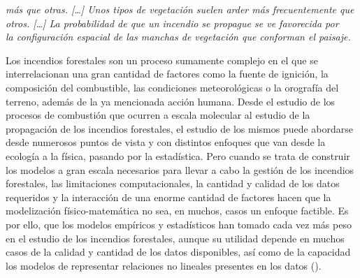 \documentclass[12pt,a4paper,]{book}
\numberwithin{dummy}{section}
\theoremstyle{ocrenumbox}
\theoremstyle{blacknumex}
\theoremstyle{blacknumbox}
\theoremstyle{ocrenum}
\theoremstyle{ocrenum}
\begin{document}
\hspace*{0.333em}\hspace*{0.333em}\hspace*{0.333em}\hspace*{0.333em}\hspace*{0.333em}\hspace*{0.333em}\emph{más
que otras. {[}\ldots{]} Unos tipos de vegetación suelen arder más
frecuentemente que }\\
\hspace*{0.333em}\hspace*{0.333em}\hspace*{0.333em}\hspace*{0.333em}\hspace*{0.333em}\hspace*{0.333em}\emph{otros.
{[}\ldots{]} La probabilidad de que un incendio se propague se ve
favorecida por }\\
\hspace*{0.333em}\hspace*{0.333em}\hspace*{0.333em}\hspace*{0.333em}\hspace*{0.333em}\hspace*{0.333em}\emph{la
configuración espacial de las manchas de vegetación que conforman el
paisaje.}

Los incendios forestales son un proceso sumamente complejo en el que se
interrelacionan una gran cantidad de factores como la fuente de
ignición, la composición del combustible, las condiciones meteorológicas
o la orografía del terreno, además de la ya mencionada acción humana.
Desde el estudio de los procesos de combustión que ocurren a escala
molecular al estudio de la propagación de los incendios forestales, el
estudio de los mismos puede abordarse desde numerosos puntos de vista y
con distintos enfoques que van desde la ecología a la física, pasando
por la estadística. Pero cuando se trata de construir los modelos a gran
escala necesarios para llevar a cabo la gestión de los incendios
forestales, las limitaciones computacionales, la cantidad y calidad de
los datos requeridos y la interacción de una enorme cantidad de factores
hacen que la modelización físico-matemática no sea, en muchos, casos un
enfoque factible. Es por ello, que los modelos empíricos y estadísticos
han tomado cada vez más peso en el estudio de los incendios forestales,
aunque su utilidad depende en muchos casos de la calidad y cantidad de
los datos disponibles, así como de la capacidad los modelos de
representar relaciones no lineales presentes en los datos
(\citet{ReviewMLApplicationsWF}).
\end{document}
